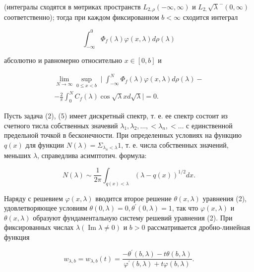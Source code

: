 \documentclass[10pt]{article}
\begin{document}
(интегралы сходятся в мөтриках пространств $L_{2, \rho}(-\infty, \infty)$ и $L_{2,} \sqrt{\lambda}^{-}(0, \infty)$ соответственно); тогда при каждом фиксированном $b<\infty$ сходится интеграл



\[

\int_{-\infty}^{0} \Phi_{f}(\lambda) \varphi(x, \lambda) d \rho(\lambda)

\]



абсолютно и равномерно относительно $x \in[0, b]$ и



\[

\begin{gathered}

\lim _{N \rightarrow \infty} \sup _{0 \leqslant x<b} \mid \int_{-\infty}^{N} \Phi_{f}(\lambda) \varphi(x, \lambda) d \rho(\lambda)- \\

-\frac{2}{\pi} \int_{0}^{N} C_{f}(\lambda) \cos \sqrt{\lambda} x d \sqrt{\lambda} \mid=0 .

\end{gathered}

\]



Пусть задача (2), (5) имеет дискретный спектр, т. е. ее спектр состоит из счетного тисла собственных значевий $\lambda_{1}, \lambda_{2}, \ldots,<\lambda_{n},<\ldots$ с единственной предельной точкой в бесконечности. При определенных условиях на функцию $q(x)$ для функции $N(\lambda)=\Sigma_{\lambda_{n}<\lambda} 1$, т. е. числа собственных значений, меньших $\lambda$, справедлива асимптотич. формула:



\[

N(\lambda) \sim \frac{1}{2 \pi} \int_{q(x)<\lambda}(\lambda-q(x))^{1 / 2} d x .

\]



Наряду с решевием $\varphi(x, \lambda)$ вводится второе решение $\theta(x, \lambda)$ уравнения (2), удовлетворяющее условиям $\theta(0, \lambda)=0, \theta^{\prime}(0, \lambda)=1$, так что $\varphi(x, \lambda)$ и $\theta(x, \lambda)$ образуют фундаментальную систему решевий уравнения (2). При фиксированных числах $\lambda(\operatorname{Im} \lambda \neq 0)$ и $b>0$ рассматривается дробно-линейная функция



\[

w_{\lambda, b}=w_{\lambda, b}(t)=\frac{-\theta^{\prime}(b, \lambda)-t \theta(b, \lambda)}{\varphi^{\prime}(b, \lambda)+t \varphi(b, \lambda)} .

\]
\end{document}
